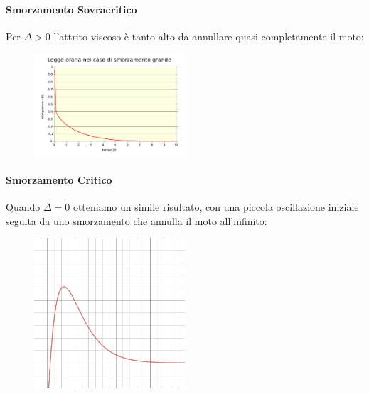 \documentclass{article}
\begin{document}
\paragraph{Smorzamento Sovracritico}
Per $\Delta>0$ l'attrito viscoso è tanto alto da annullare quasi completamente il moto:
\begin{figure}[H]
    \centering
    \includegraphics[width=0.5\textwidth]{Appunti/SmorzamentoSovracritico.png}
    \label{sovrasmorz}
\end{figure}
\pagebreak
\paragraph{Smorzamento Critico}
Quando $\Delta=0$ otteniamo un simile risultato, con una piccola oscillazione iniziale seguita da uno smorzamento che annulla il moto all'infinito:
\begin{figure}[H]
    \centering
    \includegraphics[width=0.5\textwidth]{Appunti/SmorzamentoCritico.png}
    \label{smorzcritico}
\end{figure}
\end{document}
